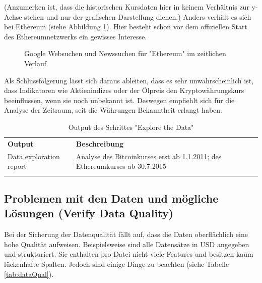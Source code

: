 (Anzumerken ist, dass die historischen Kursdaten hier in keinem Verhältnis zur y-Achse stehen und nur der grafischen Darstellung dienen.)
Anders verhält es sich bei Ethereum (siehe Abbildung \ref{fig:PublicInterestETH}). Hier besteht schon vor dem offiziellen Start des Ethereumnetzwerks\citep{tual_ethereum_2015} ein gewisses Interesse.
\begin{figure}[H]
\centering
{}
\caption{Google Websuchen und Newssuchen für "Ethereum" im zeitlichen Verlauf}
\label{fig:PublicInterestETH}
\end{figure}
Als Schlussfolgerung lässt sich daraus ableiten, dass es sehr unwahrscheinlich ist, dass Indikatoren wie Aktienindizes oder der Ölpreis den Kryptowährungskurs beeinflussen, wenn sie noch unbekannt ist. Deswegen empfiehlt sich für die Analyse der Zeitraum, seit die Währungen Bekanntheit erlangt haben. 

\begin{centering} \begin{longtable}[H]{|p{}|p{12cm}|}
\hline
\textbf{Output} & \textbf{Beschreibung} \\ 
\hhline{==}
Data exploration report & Analyse des Bitcoinkurses erst ab 1.1.2011; des Ethereumkurses ab 30.7.2015\\
\hline
\caption{Output des Schrittes "Explore the Data"}
\end{longtable} \end{centering}

\subsection{Problemen mit den Daten und mögliche Lösungen (Verify Data Quality)}
Bei der Sicherung der Datenqualität fällt auf, dass die Daten oberflächlich eine hohe Qualität aufweisen. Beispielsweise sind alle Datensätze in USD angegeben und strukturiert. Sie enthalten pro Datei nicht viele Features und besitzen kaum lückenhafte Spalten. Jedoch sind einige Dinge zu beachten (siehe Tabelle \ref{tab:dataQual}).

